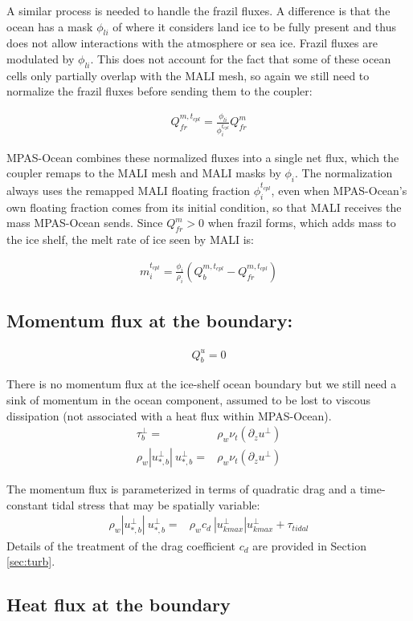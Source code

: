 \documentclass[11pt]{report}
\newcommand{\bea}{\begin{eqnarray}}
\newcommand{\eea}{\end{eqnarray}}
\begin{document}
A similar process is needed to handle the frazil fluxes. A difference is that the ocean has a mask $\phi_{li}$ of where it considers land ice to be fully present and thus does not allow interactions with the atmosphere or sea ice.  Frazil fluxes are modulated by $\phi_{li}$.  This does not account for the fact that some of these ocean cells only partially overlap with the MALI mesh, so again we still need to normalize the frazil fluxes before sending them to the coupler:

\bea
    Q_{fr}^{m,t_{cpl}} = \frac{\phi_{li}}{\phi_i^{t_{cpl}}} Q_{fr}^m
\eea


MPAS-Ocean combines these normalized fluxes into a single net flux, which the coupler remaps to the MALI mesh and MALI masks by $\phi_i$.  The normalization always uses the remapped MALI floating fraction $\phi_i^{t_{cpl}}$, even when MPAS-Ocean's own floating fraction comes from its initial condition, so that MALI receives the mass MPAS-Ocean sends.  Since $Q_{fr}^m > 0$ when frazil forms, which adds mass to the ice shelf, the melt rate of ice seen by MALI is:

\bea
    m_i^{t_{cpl}} = \frac{\phi_i}{\rho_i} \left(Q_b^{m,t_{cpl}} - Q_{fr}^{m,t_{cpl}} \right)
\eea

\subsection{Momentum flux at the boundary:}
\bea
    Q_b^u = 0
\eea

There is no momentum flux at the ice-shelf ocean boundary but we still need a sink of momentum in the ocean component, assumed to be lost to viscous dissipation (not associated with a heat flux within MPAS-Ocean).
\bea
    \tau_b^\perp =& \rho_w \nu_t(\partial_z u^\perp)\\
    \rho_w|u_{*,b}^\perp|\: u_{*,b}^\perp =& \rho_w\nu_t(\partial_z u^\perp)
\eea

The momentum flux is parameterized in terms of quadratic drag and a time-constant tidal stress that may be spatially variable:
\bea
    \rho_w|u_{*,b}^\perp|\: u_{*,b}^\perp =& \rho_w c_d\:|u^\perp_{kmax}|u^\perp_{kmax} + \tau_{tidal}
\eea
Details of the treatment of the drag coefficient $c_d$ are provided in Section \ref{sec:turb}.

\subsection{Heat flux at the boundary}\label{sec:heat_flux}
\end{document}
